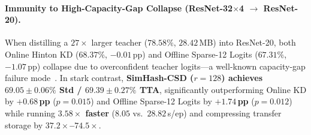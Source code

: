 \documentclass{article}
\begin{document}
\paragraph{Immunity to High-Capacity-Gap Collapse (ResNet-32$\times$4 $\to$ ResNet-20).}
When distilling a $27\times$ larger teacher ($78.58\%$, $28.42$\,MB) into ResNet-20, both Online Hinton KD ($68.37\%$, $-0.01$\,pp) and Offline Sparse-12 Logits ($67.31\%$, $-1.07$\,pp) collapse due to overconfident teacher logits---a well-known capacity-gap failure mode~\citep{huang2022dist}. In stark contrast, \textbf{SimHash-CSD ($r=128$) achieves $69.05\pm0.06\%$ Std / $69.39\pm0.27\%$ TTA}, significantly outperforming Online KD by \textbf{$+0.68$\,pp} ($p=0.015$) and Offline Sparse-12 Logits by \textbf{$+1.74$\,pp} ($p=0.012$) while running \textbf{$3.58\times$ faster} ($8.05$ vs.\ $28.82$\,s/ep) and compressing transfer storage by \textbf{$37.2\times$--$74.5\times$}.

\begin{table}[htbp]
\centering
\caption{Second-dataset benchmark on STL-10 ($64\times64$ natural images, 150 epochs, 3 seeds; ResNet-56 teacher $81.30\%$, $3.26$\,MB) and CRD-style linear representation transfer probing (CIFAR-100 $\to$ STL-10).}
\label{tab:stl10}
\small
{}
\end{table}
\end{document}
